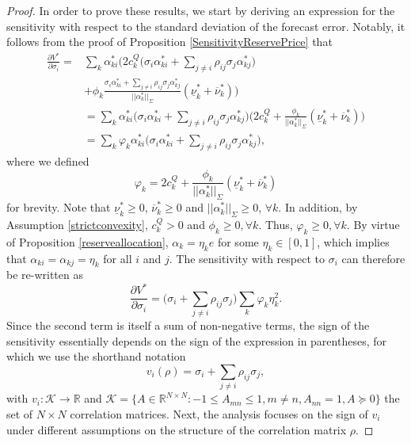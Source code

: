 \documentclass{article}
\begin{document}
\begin{proof} In order to prove these results, we start by deriving an expression for the sensitivity with respect to the standard deviation of the forecast error. Notably, it follows from the proof of Proposition \ref{SensitivityReservePrice} that
\begin{align*}
\frac{\partial V^*}{\partial \sigma_i} =& \sum_k\alpha_{ki}^*\Big(2c_k^Q\big(\sigma_i \alpha_{ki}^* + \sum_{j \ne i} \rho_{ij} \sigma_j\alpha_{kj}^*\big)\\
&+ \phi_k \frac{\sigma_i \alpha_{ki}^* + \sum_{j \ne i} \rho_{ij} \sigma_j \alpha_{kj}^*}{||\alpha_k^*||_{\Sigma}}(\underline{\nu}_k^* + \overline{\nu}_k^*)\Big)\\
&=  \sum_k \alpha_{ki}^* \Big(\sigma_i \alpha_{ki}^* + \sum_{j \ne i} \rho_{ij} \sigma_j\alpha_{kj}^*\Big)\Big(2c_k^Q + \frac{\phi_k}{||\alpha_k^*||_{\Sigma}}(\underline{\nu}_k^* + \overline{\nu}_k^*)\Big)\\
&= \sum_k \varphi_k \alpha_{ki}^* \Big(\sigma_i \alpha_{ki}^* + \sum_{j \ne i} \rho_{ij} \sigma_j\alpha_{kj}^*\Big),
\end{align*}
where we defined
\begin{equation*}
\varphi_k = 2c_k^Q + \frac{\phi_k}{||\alpha_k^*||_{\Sigma}}(\underline{\nu}_k^* + \overline{\nu}_k^*)
\end{equation*}
for brevity. Note that $\underline{\nu}_k^* \ge 0$, $\overline{\nu}_k^* \ge 0$ and $||\alpha_k^*||_{\Sigma} \ge 0$, $\forall k$. In addition, by Assumption \ref{strictconvexity}, $c_k^Q > 0$ and $\phi_k \ge 0, \forall k$. Thus, $\varphi_k \ge 0, \forall k$. By virtue of Proposition \ref{reserveallocation}, $\alpha_k = \eta_k e$ for some $\eta_k \in [0, 1]$, which implies that $\alpha_{ki} = \alpha_{kj} = \eta_k$ for all $i$ and $j$. The sensitivity with respect to $\sigma_i$ can therefore be re-written as
\begin{equation*}
\frac{\partial V^*}{\partial \sigma_i} = \bigg(\sigma_i + \sum_{j \ne i} \rho_{ij} \sigma_j \bigg)\sum_k \varphi_k \eta_k^2.
\end{equation*}
Since the second term is itself a sum of non-negative terms, the sign of the sensitivity essentially depends on the sign of the expression in parentheses, for which we use the shorthand notation
\begin{equation*}
v_{i}(\rho) = \sigma_i + \sum_{j \ne i} \rho_{ij} \sigma_j,
\end{equation*}
with $v_{i}: \mathcal{K} \rightarrow \mathbb{R}$ and $\mathcal{K} = \{A \in \mathbb{R}^{N \times N}: -1 \le A_{mn} \le 1, m \ne n, A_{nn} = 1, A \succeq 0\}$ the set of $N \times N$ correlation matrices. Next, the analysis focuses on the sign of $v_i$ under different assumptions on the structure of the correlation matrix $\rho$.

\end{proof}
\end{document}
